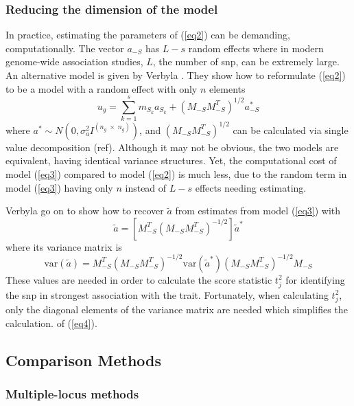 \documentclass{article}
\begin{document}
\subsubsection{Reducing the dimension of the model}
In practice, estimating the parameters of (\ref{eq2}) can be demanding, computationally. 
The vector $a_{-S}$ has $L-s$ random effects where in modern genome-wide association studies, 
$L$, the number of snp, can be extremely large.  An alternative model is given by 
Verbyla \cite{verbyla2012rwgaim,verbyla2014whole}. 
They show how to reformulate (\ref{eq2}) to be a model with a random effect with only $n$ elements
\begin{equation}
\label{eq3}
u_g = \sum_{k=1}^s  m_{S_k} a_{S_k} + (M_{-S} M_{-S}^T)^{1/2} a^*_{-S}
\end{equation}
where $a^* \sim N(0, \sigma_a^2 I^{(n_g \; \times \;  n_g)})$, and 
$(M_{-S} M_{-S}^T)^{1/2}$ can be calculated via single value decomposition (ref).  
Although it may not be obvious, the two models are equivalent, 
having identical variance structures. Yet, the computational cost of model (\ref{eq3}) compared to 
model (\ref{eq2}) is much less, due to the random term in model (\ref{eq3}) having only $n$ instead of $L-s$ 
effects needing estimating. 

Verbyla \cite{verbyla2012rwgaim,verbyla2014whole} go on to show how to recover $\widetilde{a}$ from estimates from model  (\ref{eq3})  with 
\begin{equation}
\widetilde{a} = \left [ M_{-S}^T (M_{-S} M_{-S}^T)^{-1/2} \right ] \widetilde{a}^*
\end{equation}
where its variance matrix is
\begin{equation}
\label{eq4}
\textrm{var}(\widetilde{a}) = M_{-S}^T (M_{-S} M_{-S}^T)^{-1/2} \textrm{var}(\widetilde{a}^*) (M_{-S} M_{-S}^T)^{-1/2} M_{-S}
\end{equation}
These values are needed in order to calculate the score statistic $t_j^2$ for identifying the snp in strongest association with the trait. 
Fortunately, when calculating $t_j^2$, only the diagonal elements of the variance matrix are needed which simplifies the  calculation. 
of (\ref{eq4}). 



\subsection{Comparison Methods}

\subsubsection{Multiple-locus methods}
\end{document}
